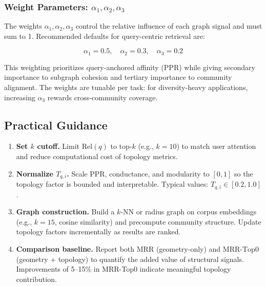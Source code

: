 \documentclass[11pt,a4paper]{article}
\begin{document}
\subsubsection{Weight Parameters: $\alpha_1, \alpha_2, \alpha_3$}

The weights $\alpha_1, \alpha_2, \alpha_3$ control the relative influence
of each graph signal and must sum to 1.  Recommended defaults for
query-centric retrieval are:

\begin{equation}
  \alpha_1 = 0.5, \quad \alpha_2 = 0.3, \quad \alpha_3 = 0.2
  \label{eq:weights}
\end{equation}

This weighting prioritizes query-anchored affinity (PPR) while giving
secondary importance to subgraph cohesion and tertiary importance to
community alignment.  The weights are tunable per task: for diversity-heavy
applications, increasing $\alpha_3$ rewards cross-community coverage.

\subsection{Practical Guidance}
\label{sec:practical}

\begin{enumerate}[nosep]
  \item \textbf{Set $k$ cutoff.}  Limit $\mathrm{Rel}(q)$ to top-$k$
    (e.g., $k=10$) to match user attention and reduce computational cost
    of topology metrics.
  \item \textbf{Normalize $T_{q,i}$.}  Scale PPR, conductance, and
    modularity to $[0,1]$ so the topology factor is bounded and
    interpretable.  Typical values: $T_{q,i} \in [0.2, 1.0]$.
  \item \textbf{Graph construction.}  Build a $k$-NN or radius graph on
    corpus embeddings (e.g., $k=15$, cosine similarity) and precompute
    community structure.  Update topology factors incrementally as
    results are ranked.
  \item \textbf{Comparison baseline.}  Report both
    $\mathrm{MRR}$ (geometry-only) and $\mathrm{MRR\text{-}Top0}$
    (geometry + topology) to quantify the added value of structural
    signals.  Improvements of 5--15\% in MRR-Top0 indicate meaningful
    topology contribution.
\end{enumerate}

\end{document}
